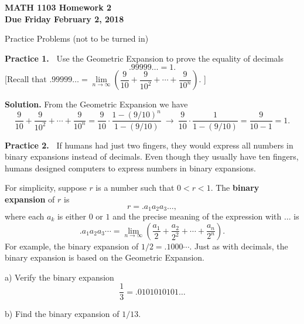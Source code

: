\documentclass[12pt]{article}
\theoremstyle{definition}
\theoremstyle{remark}
\theoremstyle{definition}
\newenvironment{Solution}{\noindent\textbf{Solution.}}{}
\begin{document}
  

{\bf MATH 1103 Homework 2}\\
{\bf Due Friday February 2, 2018}


Practice Problems (not to be turned in)

\vskip5pt
{\bf Practice 1.\ } Use the Geometric Expansion to prove the equality of decimals
\[.99999\dots=1.\]
[Recall that 
$.99999\dots=\lim\limits_{n\to\infty}\left(\dfrac{9}{10}+\dfrac{9}{10^2}+\cdots+\dfrac{9}{10^n}\right).$
]

\begin{Solution}
From the Geometric Expansion we have 
\[\dfrac{9}{10}+\dfrac{9}{10^2}+\cdots+\dfrac{9}{10^n}=
\frac{9}{10}\cdot \frac{1-(9/10)^{n}}{1-(9/10)}\ \to\ 
\frac{9}{10}\cdot \frac{1}{1-(9/10)}=\frac{9}{10-1}=1.
\]

\end{Solution}

{\bf Practice 2.\ }   If humans  had just two fingers, they would express all numbers in binary expansions instead of decimals. Even though they usually have ten fingers,  humans designed computers to express numbers in binary expansions. 

For simplicity, suppose $r$ is a number such that $0<r<1$.
The {\bf binary expansion} of $r$ is 
\[r=.a_1a_2a_3\dots, \]
where each $a_k$ is either $0$ or $1$ and the precise meaning of the expression with $\dots$ is 
\[.a_1a_2a_3\cdots
=\lim_{n\to\infty} \left(\frac{a_1}{2}+\frac{a_2}{2^2}+\cdots+\frac{a_n}{2^n}\right).
\]
For example, the binary expansion of $1/2=.1000\cdots$. 
Just as with decimals, the binary expansion is based on the Geometric Expansion. 

a) Verify the binary expansion
\[\frac{1}{3}= .0101010101\dots
\]

b) Find the binary expansion of $1/13$.
\end{document}
